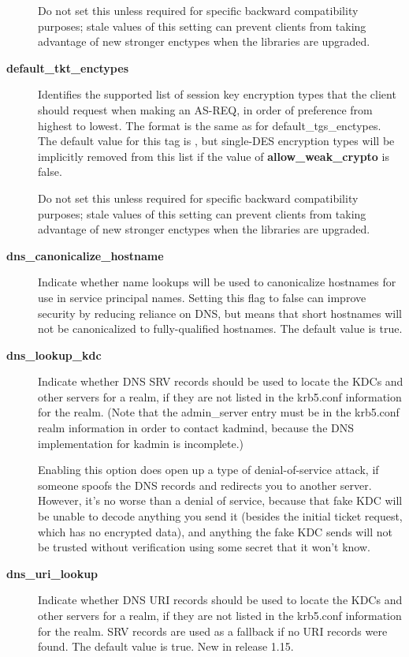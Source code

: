 \documentclass[letterpaper,10pt,english]{sphinxmanual}
\begin{document}
\begin{description}
Do not set this unless required for specific backward
compatibility purposes; stale values of this setting can prevent
clients from taking advantage of new stronger enctypes when the
libraries are upgraded.

\item[{\textbf{default\_tkt\_enctypes}}] \leavevmode
Identifies the supported list of session key encryption types that
the client should request when making an AS-REQ, in order of
preference from highest to lowest.  The format is the same as for
default\_tgs\_enctypes.  The default value for this tag is
, but single-DES encryption types will be implicitly
removed from this list if the value of \textbf{allow\_weak\_crypto} is
false.

Do not set this unless required for specific backward
compatibility purposes; stale values of this setting can prevent
clients from taking advantage of new stronger enctypes when the
libraries are upgraded.

\item[{\textbf{dns\_canonicalize\_hostname}}] \leavevmode
Indicate whether name lookups will be used to canonicalize
hostnames for use in service principal names.  Setting this flag
to false can improve security by reducing reliance on DNS, but
means that short hostnames will not be canonicalized to
fully-qualified hostnames.  The default value is true.

\item[{\textbf{dns\_lookup\_kdc}}] \leavevmode
Indicate whether DNS SRV records should be used to locate the KDCs
and other servers for a realm, if they are not listed in the
krb5.conf information for the realm.  (Note that the admin\_server
entry must be in the krb5.conf realm information in order to
contact kadmind, because the DNS implementation for kadmin is
incomplete.)

Enabling this option does open up a type of denial-of-service
attack, if someone spoofs the DNS records and redirects you to
another server.  However, it's no worse than a denial of service,
because that fake KDC will be unable to decode anything you send
it (besides the initial ticket request, which has no encrypted
data), and anything the fake KDC sends will not be trusted without
verification using some secret that it won't know.

\item[{\textbf{dns\_uri\_lookup}}] \leavevmode
Indicate whether DNS URI records should be used to locate the KDCs
and other servers for a realm, if they are not listed in the
krb5.conf information for the realm.  SRV records are used as a
fallback if no URI records were found.  The default value is true.
New in release 1.15.


\end{description}
\end{document}
